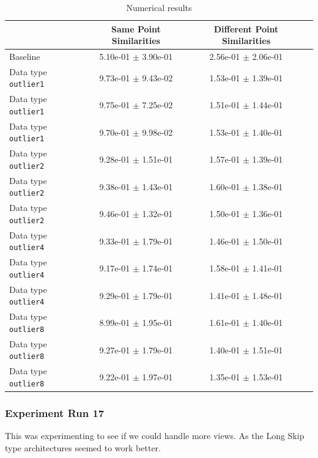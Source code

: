 \documentclass[a4paper]{article}
\begin{document}
\begin{table}[H]
  \caption{Numerical results}
      \begin{tabular}{|l|c|c|c|} \hline
                                      &  Same Point Similarities  &  Different Point Similarities  \\ \hline
Baseline   & 5.10e-01 $\pm$ 3.90e-01 & 2.56e-01 $\pm$ 2.06e-01 \\ \hline
Data type \texttt{outlier1} & 9.73e-01 $\pm$ 9.43e-02 & 1.53e-01 $\pm$ 1.39e-01 \\ \hline
Data type \texttt{outlier1} & 9.75e-01 $\pm$ 7.25e-02 & 1.51e-01 $\pm$ 1.44e-01 \\ \hline
Data type \texttt{outlier1} & 9.70e-01 $\pm$ 9.98e-02 & 1.53e-01 $\pm$ 1.40e-01 \\ \hline
Data type \texttt{outlier2} & 9.28e-01 $\pm$ 1.51e-01 & 1.57e-01 $\pm$ 1.39e-01 \\ \hline
Data type \texttt{outlier2} & 9.38e-01 $\pm$ 1.43e-01 & 1.60e-01 $\pm$ 1.38e-01 \\ \hline
Data type \texttt{outlier2} & 9.46e-01 $\pm$ 1.32e-01 & 1.50e-01 $\pm$ 1.36e-01 \\ \hline
Data type \texttt{outlier4} & 9.33e-01 $\pm$ 1.79e-01 & 1.46e-01 $\pm$ 1.50e-01 \\ \hline
Data type \texttt{outlier4} & 9.17e-01 $\pm$ 1.74e-01 & 1.58e-01 $\pm$ 1.41e-01 \\ \hline
Data type \texttt{outlier4} & 9.29e-01 $\pm$ 1.79e-01 & 1.41e-01 $\pm$ 1.48e-01 \\ \hline
Data type \texttt{outlier8} & 8.99e-01 $\pm$ 1.95e-01 & 1.61e-01 $\pm$ 1.40e-01 \\ \hline
Data type \texttt{outlier8} & 9.27e-01 $\pm$ 1.79e-01 & 1.40e-01 $\pm$ 1.51e-01 \\ \hline
Data type \texttt{outlier8} & 9.22e-01 $\pm$ 1.97e-01 & 1.35e-01 $\pm$ 1.53e-01 \\ \hline
      \end{tabular}
      \label{fig:tab1}
\end{table}

\subsubsection*{Experiment Run 17}
This was experimenting to see if we could handle more views. As the Long Skip type architectures seemed to work better. 
\end{document}
